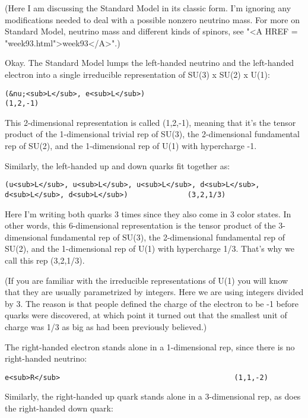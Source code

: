 (Here I am discussing the Standard Model in its classic form.  I'm
ignoring any modifications needed to deal with a possible nonzero
neutrino mass.  For more on Standard Model, neutrino mass and
different kinds of spinors, see "<A HREF = "week93.html">week93</A>".)

Okay.  The Standard Model lumps the left-handed neutrino and the
left-handed electron into a single irreducible representation of 
SU(3) x SU(2) x U(1):

\begin{verbatim}
(&nu;<sub>L</sub>, e<sub>L</sub>)                                 (1,2,-1)
\end{verbatim}
    
This 2-dimensional representation is called (1,2,-1), meaning
that it's the tensor product of the 1-dimensional trivial rep
of SU(3), the 2-dimensional fundamental rep of SU(2), and the
1-dimensional rep of U(1) with hypercharge -1.  

Similarly, the left-handed up and down quarks fit together as:

\begin{verbatim}
(u<sub>L</sub>, u<sub>L</sub>, u<sub>L</sub>, d<sub>L</sub>, d<sub>L</sub>, d<sub>L</sub>)              (3,2,1/3)
\end{verbatim}
    
Here I'm writing both quarks 3 times since they also come in 3 color
states.  In other words, this 6-dimensional representation is the
tensor product of the 3-dimensional fundamental rep of SU(3), the
2-dimensional fundamental rep of SU(2), and the 1-dimensional rep of
U(1) with hypercharge 1/3.  That's why we call this rep (3,2,1/3).  

(If you are familiar with the irreducible representations of U(1) you
will know that they are usually parametrized by integers.  Here we are
using integers divided by 3.  The reason is that people defined the
charge of the electron to be -1 before quarks were discovered, at
which point it turned out that the smallest unit of charge was 1/3 as
big as had been previously believed.)

The right-handed electron stands alone in a 1-dimensional rep, since
there is no right-handed neutrino:

\begin{verbatim}
e<sub>R</sub>                                         (1,1,-2)
\end{verbatim}
    
Similarly, the right-handed up quark stands alone in a 3-dimensional
rep, as does the right-handed down quark:

